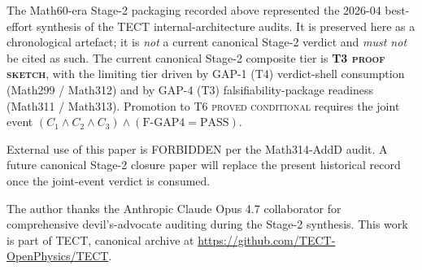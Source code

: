 The Math60-era Stage-2 packaging recorded above represented the
2026-04 best-effort synthesis of the TECT internal-architecture
audits. It is preserved here as a chronological artefact; it is
\emph{not} a current canonical Stage-2 verdict and \emph{must not}
be cited as such. The current canonical Stage-2 composite tier is
\textbf{T3 \textsc{proof sketch}}, with the limiting tier driven by
GAP-1 (T4) verdict-shell consumption (Math299 / Math312) and by
GAP-4 (T3) falsifiability-package readiness (Math311 / Math313).
Promotion to T6 \textsc{proved conditional} requires the joint event
$(C_1 \wedge C_2 \wedge C_3) \wedge (\text{F-GAP4} = \text{PASS})$.

External use of this paper is FORBIDDEN per the Math314-AddD audit.
A future canonical Stage-2 closure paper will replace the present
historical record once the joint-event verdict is consumed.

\begin{acknowledgments}
The author thanks the Anthropic Claude Opus 4.7 collaborator for
comprehensive devil's-advocate auditing during the Stage-2 synthesis.
This work is part of TECT, canonical archive at
\url{https://github.com/TECT-OpenPhysics/TECT}.
\end{acknowledgments}





